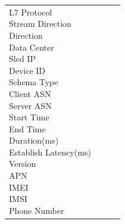 \begin{description}
\begin{longtable}{p{}|p{}|p{}|p{}}
{                                                                                                    L7 Protocol\\
                                                                                                    Stream Direction\\
                                                                                                    Direction\\
                                                                                                    Data Center\\
                                                                                                    Sled IP\\
                                                                                                    Device ID\\
                                                                                                    Schema Type\\
                                                                                                    Client ASN\\
                                                                                                    Server ASN\\
                                                                                                    Start Time\\
                                                                                                    End Time\\
                                                                                                    Duration(ms)\\
                                                                                                    Establish Latency(ms)\\
                                                                                                    Version\\
                                                                                                    APN\\
                                                                                                    IMEI\\
                                                                                                    IMSI\\
                                                                                                    Phone Number\\
}
\end{longtable}
\end{description}
